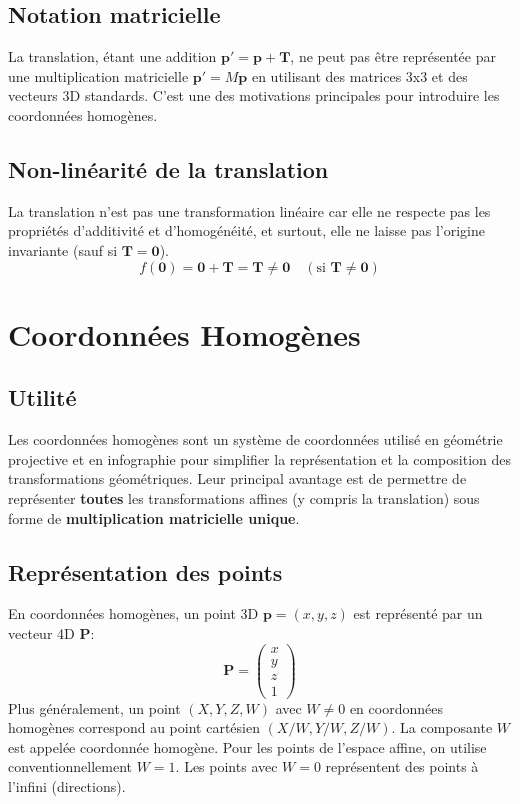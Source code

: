 \subsection{Notation matricielle}
La translation, étant une addition \( \mathbf{p'} = \mathbf{p} + \mathbf{T} \), ne peut pas être représentée par une multiplication matricielle \( \mathbf{p'} = M \mathbf{p} \) en utilisant des matrices 3x3 et des vecteurs 3D standards. C'est une des motivations principales pour introduire les coordonnées homogènes.
\subsection{Non-linéarité de la translation}
La translation n'est pas une transformation linéaire car elle ne respecte pas les propriétés d'additivité et d'homogénéité, et surtout, elle ne laisse pas l'origine invariante (sauf si \( \mathbf{T} = \mathbf{0} \)).
\[ f(\mathbf{0}) = \mathbf{0} + \mathbf{T} = \mathbf{T} \neq \mathbf{0} \quad (\text{si } \mathbf{T} \neq \mathbf{0}) \]
\section{Coordonnées Homogènes}
\subsection{Utilité}
Les coordonnées homogènes sont un système de coordonnées utilisé en géométrie projective et en infographie pour simplifier la représentation et la composition des transformations géométriques. Leur principal avantage est de permettre de représenter \textbf{toutes} les transformations affines (y compris la translation) sous forme de \textbf{multiplication matricielle unique}.
\subsection{Représentation des points}
En coordonnées homogènes, un point 3D \( \mathbf{p} = (x, y, z) \) est représenté par un vecteur 4D \( \mathbf{P} \):
\[ \mathbf{P} = \begin{pmatrix} x \\ y \\ z \\ 1 \end{pmatrix} \]
Plus généralement, un point \( (X, Y, Z, W) \) avec \( W \neq 0 \) en coordonnées homogènes correspond au point cartésien \( (X/W, Y/W, Z/W) \). La composante \( W \) est appelée coordonnée homogène. Pour les points de l'espace affine, on utilise conventionnellement \( W=1 \). Les points avec \( W=0 \) représentent des points à l'infini (directions).
